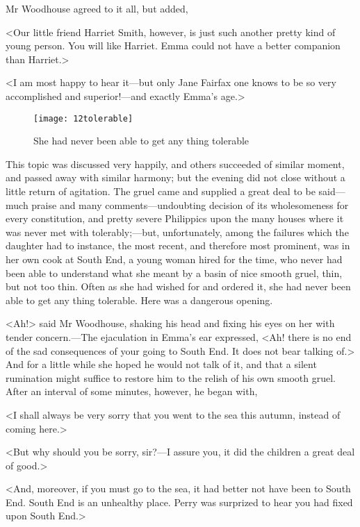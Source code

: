 Mr Woodhouse agreed to it all, but added,

<Our little friend Harriet Smith, however, is just such another pretty kind of young person. You will like Harriet. Emma could not have a better companion than Harriet.>

<I am most happy to hear it—but only Jane Fairfax one knows to be so very accomplished and superior!—and exactly Emma's age.>

\begin{figure}[tbph]
\centering
\texttt{[image: 12tolerable]}
\caption{She had never been able to get any thing tolerable}
\end{figure}

This topic was discussed very happily, and others succeeded of similar moment, and passed away with similar harmony; but the evening did not close without a little return of agitation. The gruel came and supplied a great deal to be said—much praise and many comments—undoubting decision of its wholesomeness for every constitution, and pretty severe Philippics upon the many houses where it was never met with tolerably;—but, unfortunately, among the failures which the daughter had to instance, the most recent, and therefore most prominent, was in her own cook at South End, a young woman hired for the time, who never had been able to understand what she meant by a basin of nice smooth gruel, thin, but not too thin. Often as she had wished for and ordered it, she had never been able to get any thing tolerable. Here was a dangerous opening.

<Ah!> said Mr Woodhouse, shaking his head and fixing his eyes on her with tender concern.—The ejaculation in Emma's ear expressed, <Ah! there is no end of the sad consequences of your going to South End. It does not bear talking of.> And for a little while she hoped he would not talk of it, and that a silent rumination might suffice to restore him to the relish of his own smooth gruel. After an interval of some minutes, however, he began with,

<I shall always be very sorry that you went to the sea this autumn, instead of coming here.>

<But why should you be sorry, sir?—I assure you, it did the children a great deal of good.>

<And, moreover, if you must go to the sea, it had better not have been to South End. South End is an unhealthy place. Perry was surprized to hear you had fixed upon South End.>

